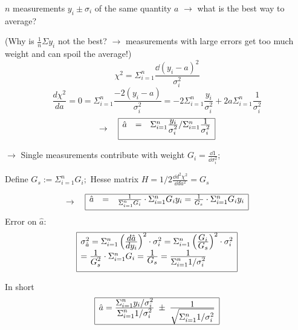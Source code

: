 \begin{slide}
\pagestyle{headings}
\sf
{}
%
\Large
$n$ measurements $y_i\pm \sigma_i$ of the same quantity
$a$ $\rightarrow$ what is the best way to average?
%

\noindent
(Why is $\frac{1}{n} \Sigma y_i$ not the best? $\rightarrow$
measurements with large errors get too much weight and can
spoil the average!)
%
\[ \chi^2 = \Sigma_{i=1}^n \frac{\dd (y_i -a)^2}{\sigma_i^2} \]
%
\[ \frac{d\chi^2}{da} = 0 = \Sigma_{i=1}^{n} \frac{-2 (y_i - a)}{\sigma_i^2}
 = -2 \Sigma_{i=1}^{n} \frac{y_i}{\sigma_i^2} + 
    2 a \Sigma_{i=1}^{n} \frac{1}{\sigma_i^2}
\]
%
\begin{equation}
\rightarrow \quad 
\begin{array}{|lll|}
\hline
\hat{a} & = & \Sigma_{i=1}^n \frac{\displaystyle y_i}{\displaystyle \sigma_i^2} /  \Sigma_{i=1}^n \frac{\displaystyle 1}{\displaystyle \sigma_i^2} 
\\[4mm]
\hline
\end{array}
\end{equation}
%
\end{slide}




\begin{slide}
\pagestyle{headings}
\sf
{}
%
\Large
$\rightarrow$ Single measurements contribute with weight 
$G_i = \frac{\dd 1}{\dd \sigma_i^2}$; 

Define $G_s:= \Sigma_{i=1}^{n} G_i;$ \hspace{5mm}
%
Hesse matrix $H = 1/2 \frac{\dd d^2\chi^2}{\dd da^2} = G_s$
%
 
\begin{equation}
\rightarrow \quad 
\begin{array}{|lll|}
\hline
\hat{a} & = & \frac{1}{\Sigma_{i=1}^n G_i}  \cdot 
\Sigma_{i=1}^n G_i y_i = \frac{1}{G_s} \cdot \Sigma_{i=1}^n G_i y_i
\\[2mm]
\hline
\end{array}
\end{equation}
%
Error on $\hat{a}$: 
%
\[ 
\begin{array}{|l|}
\hline
\sigma_{\hat{a}}^2 = \Sigma_{i=1}^n \left( \frac{\displaystyle d\hat{a}}{\displaystyle dy_i}\right)^2 
\cdot \sigma_i^2 = 
\Sigma_{i=1}^n \left( \frac{\displaystyle G_i}{\displaystyle G_s}\right)^2 
\cdot \sigma_i^2 \\
= 
\frac{\displaystyle 1}{\displaystyle G_s^2} \cdot \Sigma_{i=1}^n G_i = \frac{\displaystyle 1}{\displaystyle G_s} = 
\frac{\displaystyle 1}{\displaystyle \Sigma_{i=1}^n 1/\sigma_i^2} 
\\[4mm]
\hline
\end{array}
\]

In short
\[ 
\begin{array}{|l|}
\hline
\hat{a} = \frac{ \displaystyle \Sigma_{i=1}^n y_i/\sigma_i^2}{\displaystyle
 \Sigma_{i=1}^n 1/\sigma_i^2} \; \pm \; \frac{\displaystyle 1}{\displaystyle 
\sqrt{\Sigma_{i=1}^n 1/\sigma_i^2} }
\\[4mm]
\hline
\end{array}
\]
\end{slide}



